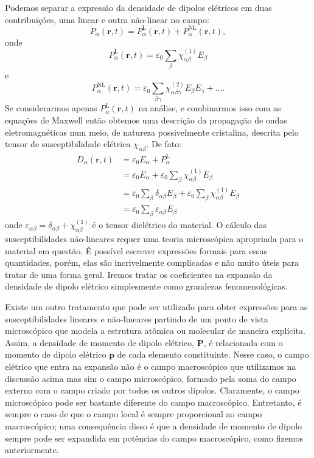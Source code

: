 \documentclass{article}
\begin{document}
Podemos separar a expressão da densidade de dipolos elétricos em duas contribuições, uma linear e outra não-linear no campo:
\begin{equation}
    P_\alpha (\mathbf{r},t) = P^{\text{L}}_\alpha (\mathbf{r},t) + P^{\text{NL}}_\alpha (\mathbf{r},t),
\end{equation}
onde
\begin{equation}
P^{\text{L}}_\alpha (\mathbf{r},t) = \varepsilon_0\sum_{\beta} \chi^{(1)}_{\alpha\beta} E_\beta
\label{eq12}
\end{equation}
e
\begin{equation}
P^{\text{NL}}_\alpha (\mathbf{r},t) = \varepsilon_0\sum_{\beta\gamma}\chi^{(2)}_{\alpha\beta\gamma} E_\beta E_\gamma + ... .
\end{equation}
Se considerarmos apenas $P^{\text{L}}_\alpha (\mathbf{r},t)$ na análise, e combinarmos isso com as equações de Maxwell então obtemos uma descrição da propagação de ondas eletromagnéticas num meio, de natureza possivelmente cristalina, descrita pelo tensor de susceptibilidade elétrica $\chi_{\alpha\beta}$. De fato:
\begin{equation}
\begin{split}
    D_{\alpha}(\mathbf{r},t) & = \varepsilon_{0} E_\alpha + P^{\text{L}}_\alpha \\
    & = \varepsilon_{0} E_\alpha + \varepsilon_0\sum_{\beta} \chi^{(1)}_{\alpha\beta} E_\beta \\
    & = \varepsilon_0\sum_{\beta}\delta_{\alpha\beta}E_\beta + \varepsilon_0\sum_{\beta} \chi^{(1)}_{\alpha\beta} E_\beta \\
    & = \varepsilon_0 \sum_{\beta}\varepsilon_{\alpha\beta}E_\beta
\end{split}
\end{equation}
onde $\varepsilon_{\alpha\beta} = \delta_{\alpha\beta} + \chi_{\alpha\beta}^{(1)}$ é o tensor dielétrico do material. O cálculo das susceptibilidades não-lineares requer uma teoria microscópica apropriada para o material em questão. É possível escrever expressões formais para essas quantidades, porém, elas são incrivelmente complicadas e não muito úteis para tratar de uma forma geral. Iremos tratar os coeficientes na expansão da densidade de dipolo elétrico simplesmente como grandezas fenomenológicas.

Existe um outro tratamento que pode ser utilizado para obter expressões para as susceptibilidades lineares e não-lineares partindo de um ponto de vista microscópico que modela a estrutura atômica ou molecular de maneira explícita. Assim, a densidade de momento de dipolo elétrico, $\mathbf{P}$, é relacionada com o momento de dipolo elétrico $\mathbf{p}$ de cada elemento constituinte. Nesse caso, o campo elétrico que entra na expansão não é o campo macroscópico que utilizamos na discussão acima mas sim o campo microscópico, formado pela soma do campo externo com o campo criado por todos os outros dipolos. Claramente, o campo microscópico pode ser bastante diferente do campo macroscópico. Entretanto, é sempre o caso de que o campo local é sempre proporcional ao campo macroscópico; uma consequência disso é que a densidade de momento de dipolo sempre pode ser expandida em potências do campo macroscópico, como fizemos anteriormente.
\end{document}
